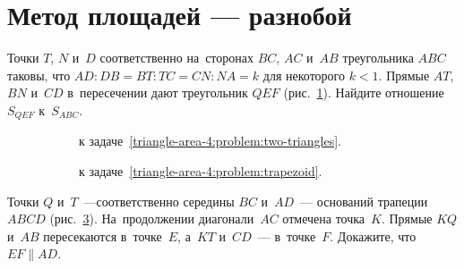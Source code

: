 
\section*{Метод площадей --- разнобой}



\begin{problems}

\item
\label{triangle-area-4:problem:two-triangles}%
Точки $T$, $N$ и~$D$ соответственно на~сторонах $BC$, $AC$ и~$AB$
треугольника $ABC$ таковы, что
\(
    AD : DB = BT : TC = CN : NA = k
\)
для некоторого $k < 1$.
Прямые $AT$, $BN$ и~$CD$ в~пересечении дают треугольник $QEF$
(рис.~\ref{triangle-area-4:problem:two-triangles:fig}).
Найдите отношение $S_{QEF}$ к~$S_{ABC}$.

\begin{figure}[hb]
\leavevmode\null\hfill
    \begin{subfigure}{0.4\textwidth}
    \begin{center}
        \caption{к задаче~\ref{triangle-area-4:problem:two-triangles}.}
        \label{triangle-area-4:problem:two-triangles:fig}
    \end{center}
    \end{subfigure}
\hfill
    \begin{subfigure}{0.4\textwidth}\centering
    \begin{center}
        \caption{к задаче~\ref{triangle-area-4:problem:trapezoid}.}
        \label{triangle-area-4:problem:trapezoid:fig}
    \end{center}
    \end{subfigure}
\hfill\null\par
    \caption{}
\end{figure}


\item
\label{triangle-area-4:problem:trapezoid}%
Точки $Q$ и~$T$~---соответственно середины $BC$ и~$AD$~--- оснований трапеции
$ABCD$ (рис.~\ref{triangle-area-4:problem:trapezoid:fig}).
На~продолжении диагонали~$AC$ отмечена точка~$K$.
Прямые $KQ$ и~$AB$ пересекаются в~точке~$E$, а~$KT$ и~$CD$~--- в~точке~$F$.
Докажите, что $EF \parallel AD$.


\end{problems}

